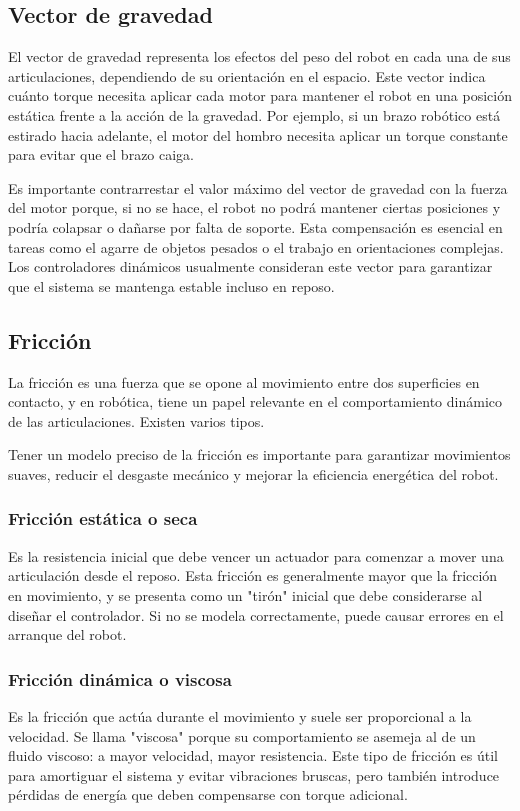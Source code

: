 \subsection{Vector de gravedad}

El vector de gravedad representa los efectos del peso del robot en cada una de sus articulaciones, dependiendo de su orientación en el espacio. Este vector indica cuánto torque necesita aplicar cada motor para mantener el robot en una posición estática frente a la acción de la gravedad. Por ejemplo, si un brazo robótico está estirado hacia adelante, el motor del hombro necesita aplicar un torque constante para evitar que el brazo caiga.

Es importante contrarrestar el valor máximo del vector de gravedad con la fuerza del motor porque, si no se hace, el robot no podrá mantener ciertas posiciones y podría colapsar o dañarse por falta de soporte. Esta compensación es esencial en tareas como el agarre de objetos pesados o el trabajo en orientaciones complejas. Los controladores dinámicos usualmente consideran este vector para garantizar que el sistema se mantenga estable incluso en reposo.
\subsection{Fricción}
La fricción es una fuerza que se opone al movimiento entre dos superficies en contacto, y en robótica, tiene un papel relevante en el comportamiento dinámico de las articulaciones. Existen varios tipos.

Tener un modelo preciso de la fricción es importante para garantizar movimientos suaves, reducir el desgaste mecánico y mejorar la eficiencia energética del robot.

\subsubsection{Fricción estática o seca}
Es la resistencia inicial que debe vencer un actuador para comenzar a mover una articulación desde el reposo. Esta fricción es generalmente mayor que la fricción en movimiento, y se presenta como un "tirón" inicial que debe considerarse al diseñar el controlador. Si no se modela correctamente, puede causar errores en el arranque del robot.

\subsubsection{Fricción dinámica o viscosa}
Es la fricción que actúa durante el movimiento y suele ser proporcional a la velocidad. Se llama "viscosa" porque su comportamiento se asemeja al de un fluido viscoso: a mayor velocidad, mayor resistencia. Este tipo de fricción es útil para amortiguar el sistema y evitar vibraciones bruscas, pero también introduce pérdidas de energía que deben compensarse con torque adicional.

